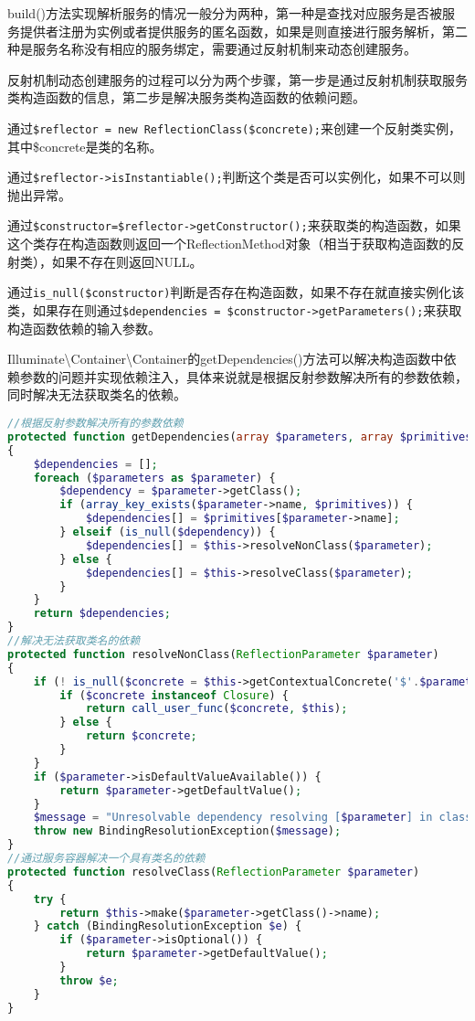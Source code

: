 build()方法实现解析服务的情况一般分为两种，第一种是查找对应服务是否被服务提供者注册为实例或者提供服务的匿名函数，如果是则直接进行服务解析，第二种是服务名称没有相应的服务绑定，需要通过反射机制来动态创建服务。

反射机制动态创建服务的过程可以分为两个步骤，第一步是通过反射机制获取服务类构造函数的信息，第二步是解决服务类构造函数的依赖问题。

\begin{compactitem}
\item 通过\texttt{\$reflector = new ReflectionClass(\$concrete);}来创建一个反射类实例，其中\$concrete是类的名称。
\item 通过\texttt{\$reflector->isInstantiable();}判断这个类是否可以实例化，如果不可以则抛出异常。
\item 通过\texttt{\$constructor=\$reflector->getConstructor();}来获取类的构造函数，如果这个类存在构造函数则返回一个ReflectionMethod对象（相当于获取构造函数的反射类），如果不存在则返回NULL。
\item 通过\texttt{is\_null(\$constructor)}判断是否存在构造函数，如果不存在就直接实例化该类，如果存在则通过\texttt{\$dependencies = \$constructor->getParameters();}来获取构造函数依赖的输入参数。
\end{compactitem}


Illuminate\textbackslash Container\textbackslash Container的getDependencies()方法可以解决构造函数中依赖参数的问题并实现依赖注入，具体来说就是根据反射参数解决所有的参数依赖，同时解决无法获取类名的依赖。



\begin{lstlisting}[language=PHP]
//根据反射参数解决所有的参数依赖
protected function getDependencies(array $parameters, array $primitives = [])
{
    $dependencies = [];
    foreach ($parameters as $parameter) {
        $dependency = $parameter->getClass();
        if (array_key_exists($parameter->name, $primitives)) {
            $dependencies[] = $primitives[$parameter->name];
        } elseif (is_null($dependency)) {
            $dependencies[] = $this->resolveNonClass($parameter);
        } else {
            $dependencies[] = $this->resolveClass($parameter);
        }
    }
    return $dependencies;
}
//解决无法获取类名的依赖
protected function resolveNonClass(ReflectionParameter $parameter)
{
    if (! is_null($concrete = $this->getContextualConcrete('$'.$parameter->name))) {
        if ($concrete instanceof Closure) {
            return call_user_func($concrete, $this);
        } else {
            return $concrete;
        }
    }
    if ($parameter->isDefaultValueAvailable()) {
        return $parameter->getDefaultValue();
    }
    $message = "Unresolvable dependency resolving [$parameter] in class {$parameter->getDeclaringClass()->getName()}";
    throw new BindingResolutionException($message);
}
//通过服务容器解决一个具有类名的依赖
protected function resolveClass(ReflectionParameter $parameter)
{
    try {
        return $this->make($parameter->getClass()->name);
    } catch (BindingResolutionException $e) {
        if ($parameter->isOptional()) {
            return $parameter->getDefaultValue();
        }
        throw $e;
    }
}
\end{lstlisting}

